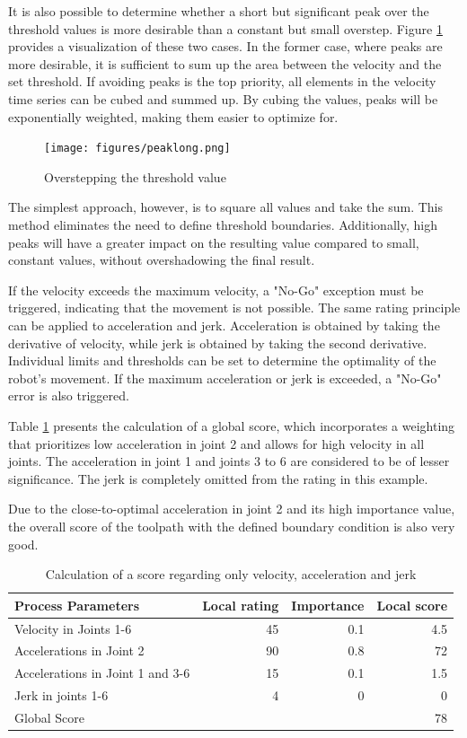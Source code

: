 It is also possible to determine whether a short but significant peak over the threshold values is more desirable than a constant but small overstep. Figure \ref{peaklong} provides a visualization of these two cases. In the former case, where peaks are more desirable, it is sufficient to sum up the area between the velocity and the set threshold. If avoiding peaks is the top priority, all elements in the velocity time series can be cubed and summed up. By cubing the values, peaks will be exponentially weighted, making them easier to optimize for.

\begin{figure}[H]
	\centerline{\texttt{[image: figures/peaklong.png]}}
	\caption{Overstepping the threshold value}
	\label{peaklong}
\end{figure}


The simplest approach, however, is to square all values and take the sum. This method eliminates the need to define threshold boundaries. Additionally, high peaks will have a greater impact on the resulting value compared to small, constant values, without overshadowing the final result.

If the velocity exceeds the maximum velocity, a "No-Go" exception must be triggered, indicating that the movement is not possible. The same rating principle can be applied to acceleration and jerk. Acceleration is obtained by taking the derivative of velocity, while jerk is obtained by taking the second derivative. Individual limits and thresholds can be set to determine the optimality of the robot's movement. If the maximum acceleration or jerk is exceeded, a "No-Go" error is also triggered.

Table \ref{VAJ} presents the calculation of a global score, which incorporates a weighting that prioritizes low acceleration in joint 2 and allows for high velocity in all joints. The acceleration in joint 1 and joints 3 to 6 are considered to be of lesser significance. The jerk is completely omitted from the rating in this example.

Due to the close-to-optimal acceleration in joint 2 and its high importance value, the overall score of the toolpath with the defined boundary condition is also very good.

\begin{table}[H]
	\centering
	\begin{tabular}{||l|r|r|r||}
		Process Parameters & Local rating & Importance & Local score\\
		\hline
		\hline
		\hline
		Velocity in Joints 1-6& 45& 0.1&4.5\\
		Accelerations in Joint 2& 90 & 0.8 & 72\\
		Accelerations in Joint 1 and 3-6 & 15& 0.1&1.5\\
		Jerk in joints 1-6& 4& 0&0\\
		
		\hline
		\hline
		\hline
		Global Score& & &78\\
		\hline
		\hline
	\end{tabular}
	
	\caption{Calculation of a score regarding only velocity, acceleration and jerk}
	\label{VAJ}
\end{table}


